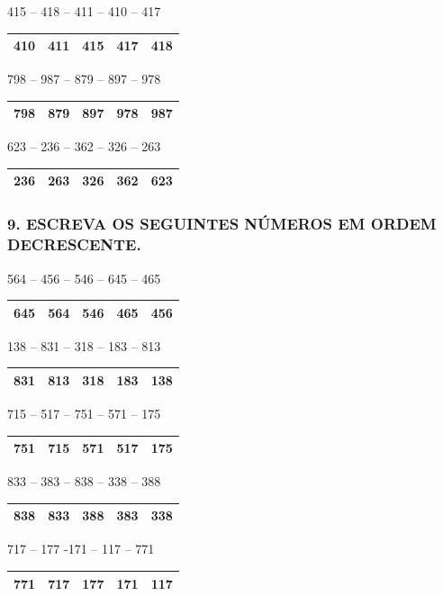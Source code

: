 415 -- 418 -- 411 -- 410 -- 417

\begin{longtable}[]{@{}lllll@{}}
\toprule
410 & 411 & 415 & 417 & 418\tabularnewline
\bottomrule
\end{longtable}

798 -- 987 -- 879 -- 897 -- 978

\begin{longtable}[]{@{}lllll@{}}
\toprule
798 & 879 & 897 & 978 & 987\tabularnewline
\bottomrule
\end{longtable}

623 -- 236 -- 362 -- 326 -- 263

\begin{longtable}[]{@{}lllll@{}}
\toprule
236 & 263 & 326 & 362 & 623\tabularnewline
\bottomrule
\end{longtable}

\subsubsection{9. ESCREVA OS SEGUINTES NÚMEROS EM ORDEM
DECRESCENTE.}\label{escreva-os-seguintes-nuxfameros-em-ordem-decrescente}

564 -- 456 -- 546 -- 645 -- 465

\begin{longtable}[]{@{}lllll@{}}
\toprule
645 & 564 & 546 & 465 & 456\tabularnewline
\bottomrule
\end{longtable}

138 -- 831 -- 318 -- 183 -- 813

\begin{longtable}[]{@{}lllll@{}}
\toprule
831 & 813 & 318 & 183 & 138\tabularnewline
\bottomrule
\end{longtable}

715 -- 517 -- 751 -- 571 -- 175

\begin{longtable}[]{@{}lllll@{}}
\toprule
751 & 715 & 571 & 517 & 175\tabularnewline
\bottomrule
\end{longtable}

833 -- 383 -- 838 -- 338 -- 388

\begin{longtable}[]{@{}lllll@{}}
\toprule
838 & 833 & 388 & 383 & 338\tabularnewline
\bottomrule
\end{longtable}

717 -- 177 -171 -- 117 -- 771

\begin{longtable}[]{@{}lllll@{}}
\toprule
771 & 717 & 177 & 171 & 117\tabularnewline
\bottomrule
\end{longtable}

